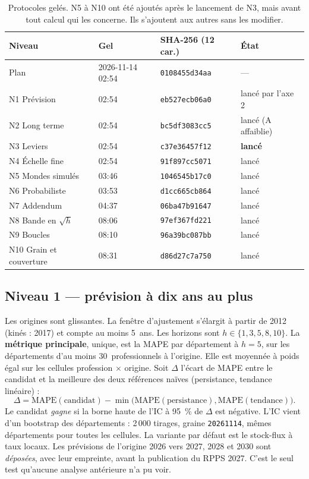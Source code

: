 \documentclass[11pt]{article}
\begin{document}
\begin{table}[h]
\centering\small
\begin{tabular}{@{}llll@{}}
\toprule
Niveau & Gel & SHA-256 (12 car.) & État \\
\midrule
Plan & 2026-11-14 02:54 & \texttt{0108455d34aa} & --- \\
N1 Prévision & 02:54 & \texttt{eb527ecb06a0} & lancé par l'axe 2 \\
N2 Long terme & 02:54 & \texttt{bc5df3083cc5} & lancé (A affaiblie) \\
N3 Leviers & 02:54 & \texttt{c37e36457f12} & \textbf{lancé} \\
N4 Échelle fine & 02:54 & \texttt{91f897cc5071} & lancé \\
N5 Mondes simulés & 03:46 & \texttt{1046545b17c0} & lancé \\
N6 Probabiliste & 03:53 & \texttt{d1cc665cb864} & lancé \\
N7 Addendum & 04:37 & \texttt{06ba47b91647} & lancé \\
N8 Bande en $\sqrt h$ & 08:06 & \texttt{97ef367fd221} & lancé \\
N9 Boucles & 08:10 & \texttt{96a39bc087bb} & lancé \\
N10 Grain et couverture & 08:31 & \texttt{d86d27c7a750} & lancé \\
\bottomrule
\end{tabular}
\caption{Protocoles gelés. N5 à N10 ont été ajoutés après le lancement de N3, mais avant tout
calcul qui les concerne. Ils s'ajoutent aux autres sans les modifier.}\label{tab:sha}
\end{table}

\subsection{Niveau 1 --- prévision à dix ans au plus}
Les origines sont glissantes. La fenêtre d'ajustement s'élargit à partir de 2012 (kinés : 2017) et
compte au moins 5\suppose{}~ans. Les horizons sont $h \in \{1, 3, 5, 8, 10\}$. La \textbf{métrique
principale}, unique, est la MAPE par département à $h = 5$, sur les départements d'au moins
30\suppose{}~professionnels à l'origine. Elle est moyennée à poids égal sur les cellules
profession $\times$ origine. Soit $\Delta$ l'écart de MAPE entre le candidat et la meilleure des deux
références naïves (persistance, tendance linéaire) :
\[
  \Delta = \mathrm{MAPE}(\text{candidat}) - \min\bigl(\mathrm{MAPE}(\text{persistance}),
  \mathrm{MAPE}(\text{tendance})\bigr).
\]
Le candidat \emph{gagne} si la borne haute de l'IC à 95~\% de $\Delta$ est négative. L'IC vient d'un
bootstrap des départements : 2\,000 tirages, graine \texttt{20261114}, mêmes départements pour
toutes les cellules. La variante par défaut est le stock-flux à taux locaux. Les prévisions de
l'origine 2026 vers 2027, 2028 et 2030 sont \emph{déposées}, avec leur empreinte, avant la
publication du RPPS 2027. C'est le seul test qu'aucune analyse antérieure n'a pu voir.
\end{document}
